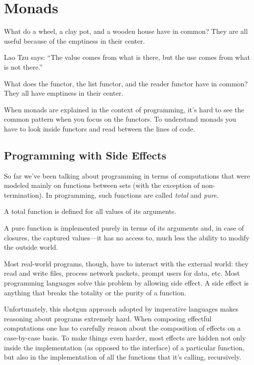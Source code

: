 \documentclass[DaoFP]{subfiles}
\begin{document}
\setcounter{chapter}{13}

\chapter{Monads}

What do a wheel, a clay pot, and a wooden house have in common? They are all useful because of the emptiness in their center. 

Lao Tzu says: ``The value comes from what is there, but the use comes from what is not there.''

What does the  functor, the list functor, and the reader functor have in common? They all have emptiness in their center. 

When monads are explained in the context of programming, it's hard to see the common pattern when you focus on the functors. To understand monads you have to look inside functors and read between the lines of code.

\section{Programming with Side Effects}

So far we've been talking about programming in terms of computations that were modeled mainly on functions between sets (with the exception of non-termination). In programming, such functions are called \emph{total} and \emph{pure}. 

A total function is defined for all values of its arguments. 

A pure function is implemented purely in terms of its arguments and, in case of closures, the captured values---it has no access to, much less the ability to modify the outside world. 

Most real-world programs, though, have to interact with the external world: they read and write files, process network packets, prompt users for data, etc. Most programming languages solve this problem by allowing side effect. A side effect is anything that breaks the totality or the purity of a function. 

Unfortunately, this shotgun approach adopted by imperative languages makes reasoning about programs extremely hard. When composing effectful computations one has to carefully reason about the composition of effects on a case-by-case basis. To make things even harder, most effects are hidden not only inside the implementation (as opposed to the interface) of a particular function, but also in the implementation of all the functions that it's calling, recursively.
\end{document}
